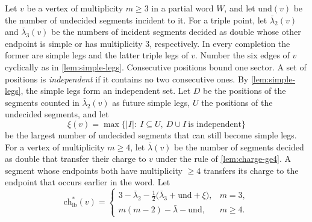 Let $v$ be a vertex of multiplicity $m\ge3$ in a partial word $W$, and let $\mathrm{und}(v)$ be the number of undecided segments incident to it.
For a triple point, let $\bar\lambda_2(v)$ and $\bar\lambda_3(v)$ be the numbers of incident segments decided as double whose other endpoint is simple or has multiplicity 3, respectively. In every completion the former are simple legs and the latter triple legs of $v$.
Number the six edges of $v$ cyclically as in \cref{lem:simple-legs}. Consecutive positions bound one sector.
A set of positions is \emph{independent} if it contains no two consecutive ones. By \cref{lem:simple-legs}, the simple legs form an independent set.
Let $D$ be the positions of the segments counted in $\bar\lambda_2(v)$ as future simple legs, $U$ the positions of the undecided segments, and let
\[
\xi(v)=\max\bigl\{|I|:\ I\subseteq U,\ D\cup I\ \text{is independent}\bigr\}
\]
be the largest number of undecided segments that can still become simple legs.
For a vertex of multiplicity $m\ge4$, let $\bar\lambda(v)$ be the number of segments decided as double that transfer their charge to $v$ under the rule of \cref{lem:charge-ge4}.
A segment whose endpoints both have multiplicity $\ge4$ transfers its charge to the endpoint that occurs earlier in the word.
Let
\begin{equation}\label{eq:charge-lb}
\mathrm{ch}^*_{\mathrm{lb}}(v)=\begin{cases}
3-\bar\lambda_2-\tfrac12\bigl(\bar\lambda_3+\mathrm{und}+\xi\bigr), & m=3,\\[2pt]
m(m-2)-\bar\lambda-\mathrm{und}, & m\ge4.
\end{cases}
\end{equation}

